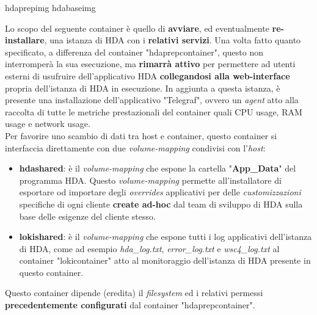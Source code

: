 \begin{namespacedesc}
	 {hdaprepimg}
	 {hdabaseimg}
	 {Lo scopo del seguente container è quello di \textbf{avviare}, ed eventualmente \textbf{re-installare}, una istanza di HDA con i \textbf{relativi servizi}. Una volta fatto quanto specificato, a differenza del container "hdaprepcontainer", questo non interromperà la sua esecuzione, ma \textbf{rimarrà attivo} per permettere ad utenti esterni di usufruire dell'applicativo HDA \textbf{collegandosi alla web-interface} propria dell'istanza di HDA in esecuzione. In aggiunta a questa istanza, è presente una installazione dell'applicativo "Telegraf", ovvero un \textit{agent} atto alla raccolta di tutte le metriche prestazionali del container quali CPU usage, RAM usage e network usage. \\
Per favorire uno scambio di dati tra host e container, questo container si interfaccia direttamente con due \textit{volume-mapping} condivisi con l'\textit{host}:
\begin{itemize}
	\item \textbf{hdashared}: è il \textit{volume-mapping} che espone la cartella "\textbf{App\_Data}" del programma HDA. Questo \textit{volume-mapping} permette all'installatore di esportare od importare degli \textit{overrides} applicativi per delle \textit{customizzazioni} specifiche di ogni cliente \textbf{create ad-hoc} dal team di sviluppo di HDA sulla base delle esigenze del cliente stesso.
	\item \textbf{lokishared}: è il \textit{volume-mapping} che espone tutti i log applicativi dell'istanza di HDA, come ad esempio \textit{hda\_log.txt}, \textit{error\_log.txt} e \textit{wsc4\_log.txt} al container "lokicontainer" atto al monitoraggio dell'istanza di HDA presente in questo container.
\end{itemize}
Questo container dipende (eredita) il \textit{filesystem} ed i relativi permessi \textbf{precedentemente configurati} dal container "hdaprepcontainer".}
\end{namespacedesc}

